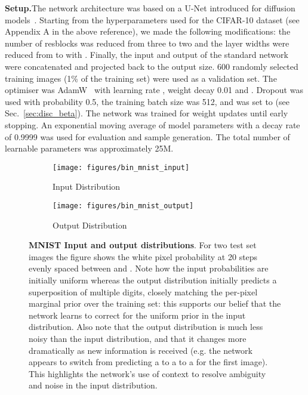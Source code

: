 \documentclass[11pt,table]{article}
\newcommand{\0}[1]{\constvec{0}{#1}}
\newcommand{\1}[1]{\constvec{1}{#1}}
\begin{document}
\noindent\textbf{Setup.}\quad The network architecture was based on a U-Net introduced for diffusion models~\citep{nichol2021improved}.
Starting from the hyperparameters used for the CIFAR-10 dataset (see Appendix A in the above reference), we made the following modifications: the number of resblocks was reduced from three to two and the layer widths were reduced from  to  with .
Finally, the input and output of the standard network were concatenated and projected back to the output size.
600 randomly selected training images (1\% of the training set) were used as a validation set.
The optimiser was AdamW~\citep{loshchilov2017decoupled} with learning rate , weight decay 0.01 and .
Dropout was used with probability 0.5, the training batch size was 512, and  was set to  (see Sec.~\ref{sec:disc_beta}).
The network was trained for  weight updates until early stopping.
An exponential moving average of model parameters with a decay rate of 0.9999 was used for evaluation and sample generation.
The total number of learnable parameters was approximately 25M.
\\

\begin{figure}[t!]
\centering
\begin{subfigure}{\textwidth}
    \centering
    \texttt{[image: figures/bin\_mnist\_input]}
    \caption{Input Distribution}
\end{subfigure}
\par\bigskip
\begin{subfigure}{\textwidth}
    \centering
    \texttt{[image: figures/bin\_mnist\_output]}
    \caption{Output Distribution}
\end{subfigure}

\caption{\textbf{MNIST Input and output distributions}. For two test set images the figure shows the white pixel probability at 20 steps evenly spaced between  and . Note how the input probabilities are initially uniform whereas the output distribution initially predicts a superposition of multiple digits, closely matching the per-pixel marginal prior over the training set: this supports our belief that the network learns to correct for the uniform prior in the input distribution. Also note that the output distribution is much less noisy than the input distribution, and that it changes more dramatically as new information is received (e.g. the network appears to switch from predicting a  to a  to a  for the first image). This highlights the network's use of context to resolve ambiguity and noise in the input distribution.}
\end{figure}
\end{document}
